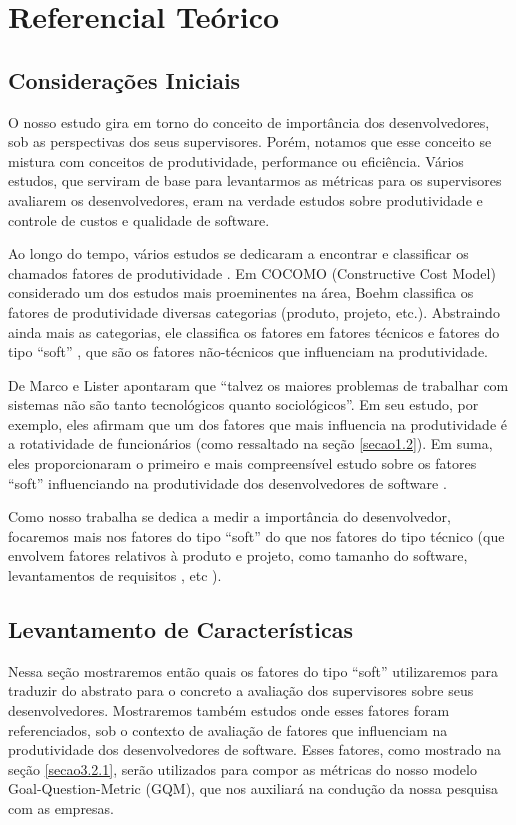 \chapter[Referencial Teórico]{Referencial Teórico}

\section{Considerações Iniciais}
O nosso estudo gira em torno do conceito de importância dos desenvolvedores, sob as perspectivas dos seus supervisores. Porém, notamos que esse conceito se mistura com conceitos de produtividade, performance ou eficiência. Vários estudos, que serviram de base para levantarmos as métricas para os supervisores avaliarem os desenvolvedores, eram na verdade estudos sobre produtividade e controle de custos e qualidade de software.

Ao longo do tempo, vários estudos se dedicaram a encontrar e classificar os chamados fatores de produtividade \cite{Vosburgh1984, Walston1977,Brooks1981,Hanson1985,Jones1986,Boehm1988,Jones1997,Scudder1991,Banker1991,Boehm1984,Banker1987,Scacchi1995,Briand1998,Jones2000,Lokan2001,Clincy2003,Wagner2008,deBarrosSampaio2010}. Em COCOMO \cite{Boehm2000} (Constructive Cost Model) considerado um dos estudos mais proeminentes na área, Boehm classifica os fatores de produtividade diversas categorias (produto, projeto, etc.). Abstraindo ainda mais as categorias, ele classifica os fatores em fatores técnicos e fatores do tipo “soft” \cite{Wagner2008}, que são os fatores não-técnicos que influenciam na produtividade.

De Marco e Lister \cite{DeMarco1987} apontaram que “talvez os maiores problemas de trabalhar com sistemas não são tanto tecnológicos quanto sociológicos”. Em seu estudo, por exemplo, eles afirmam que um dos fatores que mais influencia na produtividade é a rotatividade de funcionários (como ressaltado na seção \ref{secao1.2}). Em suma, eles proporcionaram o primeiro e mais compreensível estudo sobre os fatores “soft” influenciando na produtividade dos desenvolvedores de software \cite{Wagner2008}.

Como nosso trabalha se dedica a medir a importância do desenvolvedor, focaremos mais nos fatores do tipo “soft” do que nos fatores do tipo técnico (que envolvem fatores relativos à produto e projeto, como tamanho do software, levantamentos de requisitos , etc \cite{deBarrosSampaio2010}).

\section{Levantamento de Características}
Nessa seção mostraremos então quais os fatores do tipo “soft” utilizaremos para traduzir do abstrato para o concreto a avaliação dos supervisores sobre seus desenvolvedores. Mostraremos também estudos onde esses fatores foram referenciados, sob o contexto de avaliação de fatores que influenciam na produtividade dos desenvolvedores de software. Esses fatores, como mostrado na seção \ref{secao3.2.1}, serão utilizados para compor as métricas do nosso modelo Goal-Question-Metric (GQM), que nos auxiliará na condução da nossa pesquisa com as empresas. 

